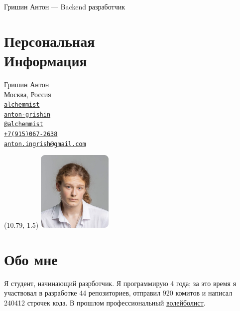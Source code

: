 \documentclass[margin,line]{resume}
\begin{document}
{\sc \large Гришин Антон --- Backend разработчик} \\
\begin{resume}
  \begin{minipage}[t]{0.55\textwidth}
    \section{\mysidestyle Персональная\\Информация}
    Гришин Антон \\
    Москва, Россия \\
    \faGithub  \space
    \href{https://github.com/alchemmist/}{\texttt{alchemmist}} \\
    \faLinkedin \space
    \href{https://www.linkedin.com/in/anton-grishin-6966a8362/}{\texttt{anton-grishin}}
    \\
    \faPaperPlane \space \href{https://t.me/alchemmist}{\texttt{@alchemmist}} \\
    \faPhone \space
    \href{tel:+1234567890}{\color{blue}\texttt{+7(915)067-2638}}  \\
    \faEnvelope \space
    \href{mailto:anton.ingrish@gmail.com}{\color{blue}\texttt{anton.ingrish@gmail.com}}
  \end{minipage}
  \begin{minipage}[H]{0.18\textwidth}
    \begin{textblock}{7}(10.79, 1.5)
      \includegraphics[width=0.27\textwidth]{images/avatar.png}
    \end{textblock}
  \end{minipage}
  \section{\mysidestyle Обо мне}
  Я студент, начинающий разрботчик. Я программирую 4 года; за
  это время я участвовал в разработке 44 репозиториев, отправил 920
  комитов и написал
  240412 строчек кода. В прошлом профессиональный
  \href{https://github.com/alchemmist/CV/blob/main/attachments/sport.pdf}{волейболист}.


\end{resume}
\end{document}
